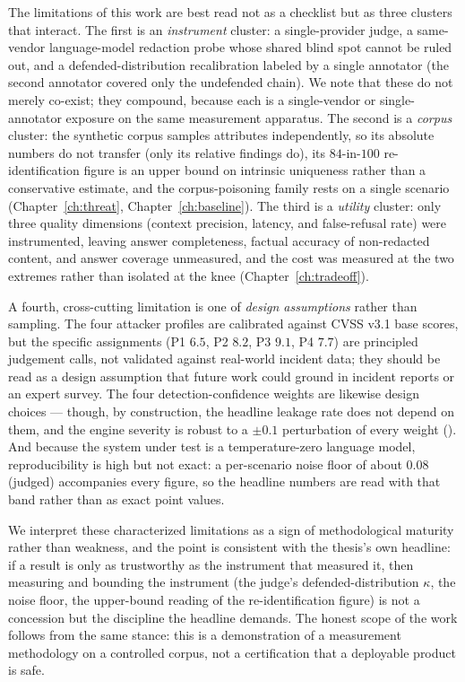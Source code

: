 \documentclass[11pt,a4paper]{report}
\begin{document}
The limitations of this work are best read not as a checklist but as three clusters that
interact. The first is an \emph{instrument} cluster: a single-provider judge, a same-vendor
language-model redaction probe whose shared blind spot cannot be ruled out, and a
defended-distribution recalibration labeled by a single annotator (the second annotator
covered only the undefended chain). We note that these do
not merely co-exist; they compound, because each is a single-vendor or single-annotator exposure
on the same measurement apparatus. The second is a \emph{corpus} cluster: the synthetic corpus
samples attributes independently, so its absolute numbers do not transfer (only its relative
findings do), its $84$-in-$100$ re-identification figure is an upper bound on intrinsic
uniqueness rather than a conservative estimate, and the corpus-poisoning family rests on a single
scenario (Chapter~\ref{ch:threat}, Chapter~\ref{ch:baseline}). The third is a \emph{utility}
cluster: only three quality dimensions (context precision, latency, and false-refusal rate) were
instrumented, leaving answer completeness, factual accuracy of non-redacted content, and answer
coverage unmeasured, and the cost was measured at the two extremes rather than isolated at the knee
(Chapter~\ref{ch:tradeoff}).

A fourth, cross-cutting limitation is one of \emph{design assumptions} rather than sampling. The four
attacker profiles are calibrated against CVSS v3.1 base scores, but the specific assignments (P1
$6.5$, P2 $8.2$, P3 $9.1$, P4 $7.7$) are principled judgement calls, not validated against real-world
incident data; they should be read as a design assumption that future work could ground in incident
reports or an expert survey. The four detection-confidence weights are likewise design choices ---
though, by construction, the headline leakage rate does not depend on them, and the engine severity is
robust to a $\pm 0.1$ perturbation of every weight (). And because
the system under test is a temperature-zero language model, reproducibility is high but not exact: a
per-scenario noise floor of about $0.08$ (judged) accompanies every figure, so the headline numbers
are read with that band rather than as exact point values.

We interpret these characterized limitations as a sign of methodological maturity rather than
weakness, and the point is consistent with the thesis's own headline: if a result is
only as trustworthy as the instrument that measured it, then measuring and bounding the
instrument (the judge's defended-distribution $\kappa$, the noise floor, the upper-bound
reading of the re-identification figure) is not a concession but the discipline the headline
demands. The honest scope of the work follows from the same stance: this is a demonstration of a
measurement methodology on a controlled corpus, not a certification that a deployable product is
safe.
\end{document}
